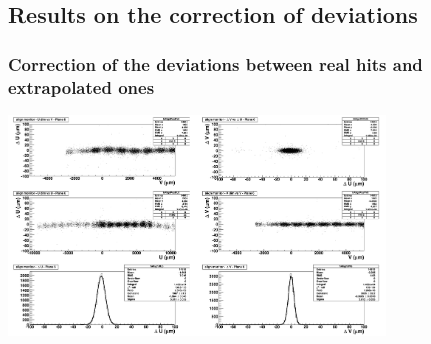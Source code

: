 \documentclass{beamer}
\begin{document}
\subsection{Results on the correction of deviations}
\begin{frame}
  \frametitle{Correction of the deviations between real hits and extrapolated ones}

  \vspace{-0.35cm}
  \begin{center}
    \includegraphics[width = 10cm]{Pictures/RsAlign_226057_pl6_corrected.png}
  \end{center}

  \vspace{-0.35cm}

  \vspace{-0.15cm}

\end{frame}
\end{document}
